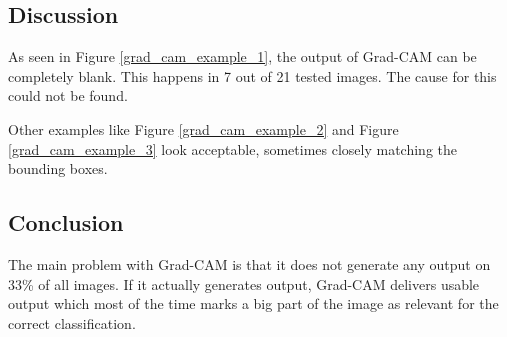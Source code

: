 \subsection{Discussion}
As seen in Figure \ref{grad_cam_example_1}, the output of Grad-CAM can be completely blank. This happens in 7 out of 21 tested images. The cause for this could not be found.

Other examples like Figure \ref{grad_cam_example_2} and Figure \ref{grad_cam_example_3} look acceptable, sometimes closely matching the bounding boxes.

\subsection{Conclusion}
The main problem with Grad-CAM is that it does not generate any output on 33\% of all images. If it actually generates output, Grad-CAM delivers usable output which most of the time marks a big part of the image as relevant for the correct classification.
